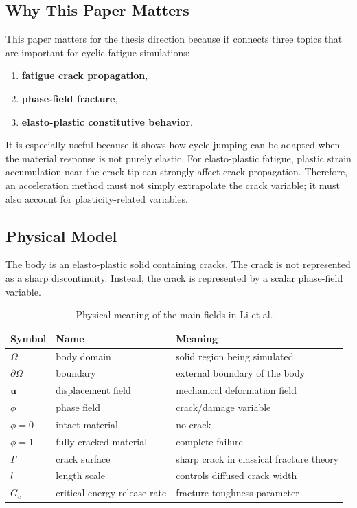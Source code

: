 \documentclass[11pt,a4paper]{article}
\begin{document}
\subsection{Why This Paper Matters}

This paper matters for the thesis direction because it connects three topics that are important for cyclic fatigue simulations:

\begin{enumerate}
    \item \textbf{fatigue crack propagation},
    \item \textbf{phase-field fracture},
    \item \textbf{elasto-plastic constitutive behavior}.
\end{enumerate}

It is especially useful because it shows how cycle jumping can be adapted when the material response is not purely elastic. For elasto-plastic fatigue, plastic strain accumulation near the crack tip can strongly affect crack propagation. Therefore, an acceleration method must not simply extrapolate the crack variable; it must also account for plasticity-related variables.

\subsection{Physical Model}

The body is an elasto-plastic solid containing cracks. The crack is not represented as a sharp discontinuity. Instead, the crack is represented by a scalar phase-field variable.

\begin{table}[H]
\centering
\caption{Physical meaning of the main fields in Li et al.}
\begin{tabular}{lll}
\toprule
Symbol & Name & Meaning \\
\midrule
$\Omega$ & body domain & solid region being simulated \\
$\partial \Omega$ & boundary & external boundary of the body \\
$\bm{u}$ & displacement field & mechanical deformation field \\
$\phi$ & phase field & crack/damage variable \\
$\phi=0$ & intact material & no crack \\
$\phi=1$ & fully cracked material & complete failure \\
$\Gamma$ & crack surface & sharp crack in classical fracture theory \\
$l$ & length scale & controls diffused crack width \\
$G_c$ & critical energy release rate & fracture toughness parameter \\
\bottomrule
\end{tabular}
\end{table}
\end{document}
